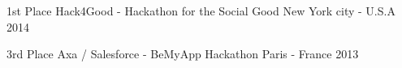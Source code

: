 



\begin{cvhonors}

  \cvhonor
    {1st Place} %
    {Hack4Good -  Hackathon for the Social Good} %
    {New York city - U.S.A} %
    {2014} %

\end{cvhonors}




\begin{cvhonors}

  \cvhonor
    {3rd Place} %
    {Axa / Salesforce - BeMyApp Hackathon} %
    {Paris - France} %
    {2013} %

\end{cvhonors}

